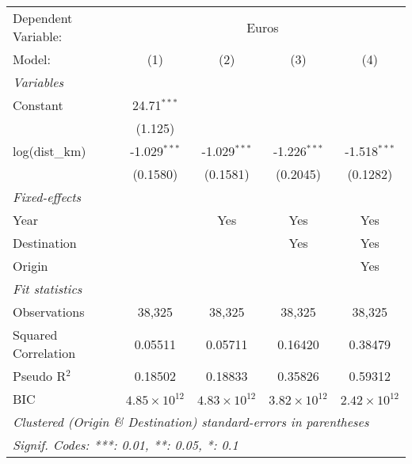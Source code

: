 \begingroup
\centering
\begin{tabular}{lcccc}
   \tabularnewline \midrule \midrule
   Dependent Variable: & \multicolumn{4}{c}{Euros}\\
   Model:              & (1)                   & (2)                   & (3)                   & (4)\\  
   \midrule
   \emph{Variables}\\
   Constant            & 24.71$^{***}$         &                       &                       &   \\   
                       & (1.125)               &                       &                       &   \\   
   log(dist\_km)       & -1.029$^{***}$        & -1.029$^{***}$        & -1.226$^{***}$        & -1.518$^{***}$\\   
                       & (0.1580)              & (0.1581)              & (0.2045)              & (0.1282)\\   
   \midrule
   \emph{Fixed-effects}\\
   Year                &                       & Yes                   & Yes                   & Yes\\  
   Destination         &                       &                       & Yes                   & Yes\\  
   Origin              &                       &                       &                       & Yes\\  
   \midrule
   \emph{Fit statistics}\\
   Observations        & 38,325                & 38,325                & 38,325                & 38,325\\  
   Squared Correlation & 0.05511               & 0.05711               & 0.16420               & 0.38479\\  
   Pseudo R$^2$        & 0.18502               & 0.18833               & 0.35826               & 0.59312\\  
   BIC                 & $4.85\times 10^{12}$  & $4.83\times 10^{12}$  & $3.82\times 10^{12}$  & $2.42\times 10^{12}$\\   
   \midrule \midrule
   \multicolumn{5}{l}{\emph{Clustered (Origin \& Destination) standard-errors in parentheses}}\\
   \multicolumn{5}{l}{\emph{Signif. Codes: ***: 0.01, **: 0.05, *: 0.1}}\\
\end{tabular}
\par\endgroup


